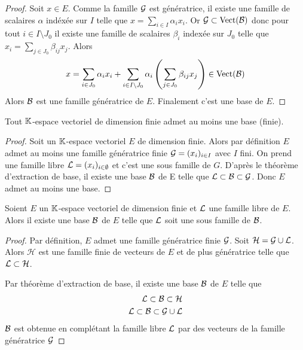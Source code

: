 \begin{proof}
  Soit \(x \in E\). Comme la famille \(\mathcal{G}\) est génératrice, il existe une famille de scalaires \(\alpha\) indéxée sur \(I\) telle que \(x = \sum_{i \in I} \alpha_i x_i\). Or \(\mathcal{G} \subset \operatorname{Vect}(\mathcal{B})\) donc pour tout \(i \in I\setminus J_0\) il existe une famille de scalaires \(\beta_i\) indexée sur \(J_0\) telle que \(x_i = \sum_{j \in J_0} \beta_{ij}x_j\). Alors
  \begin{equation}
    x= \sum_{i \in J_0} \alpha_i x_i + \sum_{i \in I\setminus J_0} \alpha_i \left(\sum_{j \in J_0} \beta_{ij}x_j \right) \in \operatorname{Vect}(\mathcal{B})
  \end{equation}
  Alors \(\mathcal{B}\) est une famille génératrice de \(E\). Finalement c'est une base de \(E\).
\end{proof}

\begin{theo}
  Tout \(\mathbb{K}\)-espace vectoriel de dimension finie admet au moins une base (finie).
\end{theo}
\begin{proof}
  Soit un \(\mathbb{K}\)-espace vectoriel \(E\) de dimension finie. Alors par définition \(E\) admet au moins une famille génératrice finie \(\mathcal{G}=(x_i)_{i \in I}\) avec \(I\) fini. On prend une famille libre \(\mathcal{L}=(x_i)_{i \in \emptyset}\) et c'est une sous famille de \(G\). D'après le théorème d'extraction de base, il existe une base \(\mathcal{B}\) de E telle que \(\mathcal{L} \subset \mathcal{B} \subset \mathcal{G}\). Donc \(E\) admet au moins une base.
\end{proof}

\begin{theo}
  Soient \(E\) un \(\mathbb{K}\)-espace vectoriel de dimension finie et \(\mathcal{L}\) une famille libre de \(E\). Alors il existe une base \(\mathcal{B}\) de \(E\) telle que \(\mathcal{L}\) soit une sous famille de \(\mathcal{B}\).
\end{theo}
\begin{proof}
  Par définition, \(E\) admet une famille génératrice finie \(\mathcal{G}\). Soit \(\mathcal{H}=\mathcal{G} \cup \mathcal{L}\). Alors \(\mathcal{H}\) est une famille finie de vecteurs de \(E\) et de plus génératrice telle que \(\mathcal{L} \subset \mathcal{H}\).

  Par théorème d'extraction de base, il existe une base \(\mathcal{B}\) de \(E\) telle que
  \begin{align}
    \mathcal{L} \subset \mathcal{B} \subset \mathcal{H} \\
    \mathcal{L} \subset \mathcal{B} \subset \mathcal{G} \cup \mathcal{L}
  \end{align}
  \(\mathcal{B}\) est obtenue en complétant la famille libre \(\mathcal{L}\) par des vecteurs de la famille génératrice \(\mathcal{G}\)
\end{proof}

